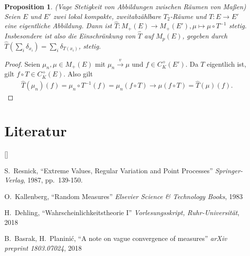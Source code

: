 \documentclass[twoside]{article}
\def\beginrefs{\begin{list}%
        {[\arabic{equation}]}{\usecounter{equation}
         \setlength{\leftmargin}{2.0truecm}\setlength{\labelsep}{0.4truecm}%
         \setlength{\labelwidth}{1.6truecm}}}
\def\endrefs{\end{list}}
\def\bibentry#1{\item[\hbox{[#1]}]}
\newtheorem{proposition}[theorem]{Proposition}
\theoremstyle{definition}
\begin{document}
\begin{proposition} (Vage Stetigkeit von Abbildungen zwischen Räumen von Maßen)\\
Seien $E$ und $E'$ zwei lokal kompakte, zweitabzählbare $T_2$-Räume und $T:E \to E'$ eine eigentliche Abbildung. Dann ist $\hat{T}:M_+(E) \to M_+(E'), \mu \mapsto \mu \circ T^{-1}$ stetig. Insbesondere ist also die Einschränkung von $\hat{T}$ auf $M_p(E)$, gegeben durch $\hat{T}\left( \sum_i \delta_{x_i} \right) = \sum_i \delta_{T(x_i)}$, stetig.
\end{proposition}

\begin{proof}
Seien $\mu_n,\mu \in M_+(E)$ mit $\mu_n \xrightarrow{v} \mu$ und $f \in C_K^+(E')$. Da $T$ eigentlich ist, gilt $f \circ T \in C_K^+(E)$. Also gilt 
\begin{align}
\hat{T}\left(\mu_n\right)(f) = \mu_n \circ T^{-1}(f) = \mu_n(f \circ T)  \to \mu(f \circ T) = \hat{T}\left(\mu\right)(f).
\end{align}
\end{proof}

\section*{Literatur}
\beginrefs
\bibentry{1}{\sc S.~Resnick}, 
``Extreme Values, Regular Variation and Point Processes''
{\it Springer-Verlag},
1987, pp.~139-150.
\bibentry{2}{\sc O.~Kallenberg}, 
``Random Measures''
{\it Elsevier Science \& Technology Books},
1983
\bibentry{3}{\sc H.~Dehling}, 
``Wahrscheinlichkeitstheorie I''
{\it Vorlesungsskript, Ruhr-Universität},
2018
\bibentry{4}{\sc B.~Basrak, H.~Planinić}, 
``A note on vague convergence of measures''
{\it arXiv preprint 1803.07024},
2018
\endrefs
\end{document}
